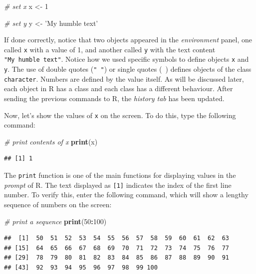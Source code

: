 \documentclass[11pt,]{book}
\newenvironment{Shaded}{\begin{snugshade}}{\end{snugshade}}
\newcommand{\KeywordTok}[1]{\textcolor[rgb]{0.27,0.27,0.27}{\textbf{#1}}}
\newcommand{\DecValTok}[1]{\textcolor[rgb]{0.06,0.06,0.06}{#1}}
\newcommand{\StringTok}[1]{\textcolor[rgb]{0.5,0.5,0.5}{#1}}
\newcommand{\CommentTok}[1]{\textcolor[rgb]{0.56,0.35,0.01}{\textit{#1}}}
\newcommand{\OperatorTok}[1]{\textcolor[rgb]{0.81,0.36,0.00}{\textbf{#1}}}
\newcommand{\NormalTok}[1]{#1}
\begin{document}
\begin{Shaded}
\begin{Highlighting}[]
\CommentTok{# set x}
\NormalTok{x <-}\StringTok{ }\DecValTok{1}

\CommentTok{# set y}
\NormalTok{y <-}\StringTok{ 'My humble text'}
\end{Highlighting}
\end{Shaded}

If done correctly, notice that two objects appeared in the
\emph{environment} panel, one called \texttt{x} with a value of 1, and
another called \texttt{y} with the text content
\texttt{"My\ humble\ text"}. Notice how we used specific symbols to
define objects \texttt{x} and \texttt{y}. The use of double quotes
(\texttt{"\ "}) or single quotes
(\texttt{\textquotesingle{}\ \textquotesingle{}}) defines objects of the
class \texttt{character}. Numbers are defined by the value itself. As
will be discussed later, each object in R has a class and each class has
a different behaviour. After sending the previous commands to R, the
\emph{history tab} has been updated.

Now, let's show the values of \texttt{x} on the screen. To do this, type
the following command:

\begin{Shaded}
\begin{Highlighting}[]
\CommentTok{# print contents of x}
\KeywordTok{print}\NormalTok{(x)}
\end{Highlighting}
\end{Shaded}

\begin{verbatim}
## [1] 1
\end{verbatim}

The \texttt{print} function is one of the main functions for displaying
values in the \emph{prompt} of R. The text displayed as \texttt{{[}1{]}}
indicates the index of the first line number. To verify this, enter the
following command, which will show a lengthy sequence of numbers on the
screen: 

\begin{Shaded}
\begin{Highlighting}[]
\CommentTok{# print a sequence}
\KeywordTok{print}\NormalTok{(}\DecValTok{50}\OperatorTok{:}\DecValTok{100}\NormalTok{)}
\end{Highlighting}
\end{Shaded}

\begin{verbatim}
##  [1]  50  51  52  53  54  55  56  57  58  59  60  61  62  63
## [15]  64  65  66  67  68  69  70  71  72  73  74  75  76  77
## [29]  78  79  80  81  82  83  84  85  86  87  88  89  90  91
## [43]  92  93  94  95  96  97  98  99 100
\end{verbatim}
\end{document}
